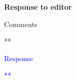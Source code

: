 \begin{center}
{\LARGE \textbf{Response to editor} \par}
\end{center}
\noindent Comments

**

\vspace{.2cm}
\noindent \textcolor{blue}{Response}

\textcolor{blue}{**}


\newpage
